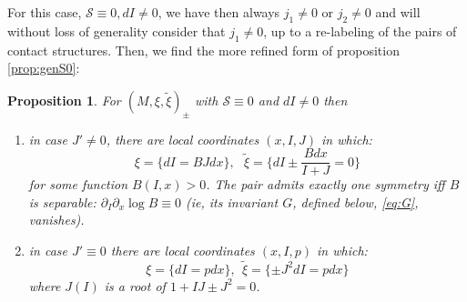 \documentclass[10pt]{amsart}
\newcommand{\del}{\partial}
\newtheorem{prop}[thm]{Proposition}
\theoremstyle{definition}
\begin{document}
For this case, $\mathcal{S}\equiv 0, dI\ne 0$, we have then always $j_1\ne 0$ or $j_2\ne 0$ and will without loss of generality consider that $j_1\ne 0$, up to a re-labeling of the pairs of contact structures. Then, we find the more refined form of proposition \ref{prop:genS0}:

\begin{prop}\label{prop:S0Gen}
    For $(M, \xi, \tilde \xi)_\pm$ with $\mathcal{S} \equiv 0$ and $dI\ne 0$ then
    \begin{enumerate}
        \item in case $J' \ne 0$, there are local coordinates $(x, I, J)$ in which:
        \[ \xi = \{ dI = BJ dx\}, ~~~\tilde \xi = \{ dI \pm \frac{Bdx}{I+J} = 0\} \]
        for some function $B(I,x) > 0$. The pair admits exactly one  symmetry iff $B$ is separable: $\del_I\del_x \log B \equiv 0$ (ie, its invariant $G$, defined below, \eqref{eq:G}, vanishes).

        
        \item in case $J' \equiv 0$ there are local coordinates $(x, I, p)$ in which: 
        \[ \xi = \{ dI = p dx \}, ~~\tilde \xi = \{ \pm J^2 dI =  p dx \} \]
        where $J(I)$ is a root of $1 + IJ \pm J^2 = 0$.

    \end{enumerate}
    
\end{prop}
\end{document}
